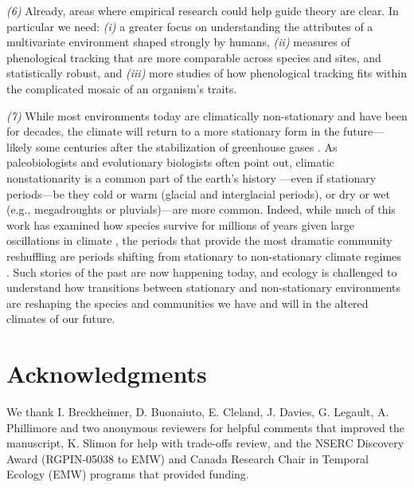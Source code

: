 \documentclass[11pt,letterpaper]{article}
\begin{document}
\emph{(6)} Already, areas where empirical research could help guide theory are clear. In particular we need: \emph{(i)} a greater focus on understanding the attributes of a multivariate environment shaped strongly by humans, \emph{(ii)} measures of phenological tracking that are more comparable across species and sites, and statistically robust, and \emph{(iii)} more studies of how phenological tracking fits within the complicated mosaic of an organism's traits.

\emph{(7)}  While most environments today are climatically non-stationary and have been for decades, the climate will return to a more stationary form in the future---likely some centuries after the stabilization of greenhouse gases \citep{ipcc2013ch12}. As paleobiologists and evolutionary biologists often point out, climatic nonstationarity is a common part of the earth's history \citep{Jansson:2002nz}---even if stationary periods---be they cold or warm (glacial and interglacial periods), or dry or wet (e.g., megadroughts or pluvials)---are more common. Indeed, while much of this work has examined how species survive for millions of years given large oscillations in climate \citep{provan2008}, the periods that provide the most dramatic community reshuffling are periods shifting from stationary to non-stationary climate regimes \citep{vrba1980,vrba1985}. Such stories of the past are now happening today, and ecology is challenged to understand how transitions between stationary and non-stationary environments are reshaping the species and communities we have and will in the altered climates of our future.


\section{Acknowledgments}
We thank I. Breckheimer, D. Buonaiuto, E. Cleland, J. Davies, G. Legault, A. Phillimore and two anonymous reviewers for helpful comments that improved the manuscript, K. Slimon for help with trade-offs review, and the NSERC Discovery Award (RGPIN-05038 to EMW) and Canada Research Chair in Temporal Ecology (EMW) programs that provided funding. 
\end{document}
